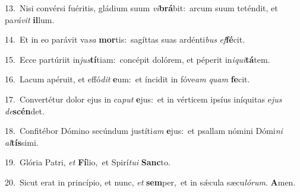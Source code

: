 {\numbfont\textcolor{\numbcolor}{13.}}~Nisi convérsi fuéritis, gládium suum \textit{vi}\-\textbf{brá}bit:~\star arcum suum teténdit, et pa\-\textit{rá}\-\textit{vit} \textbf{il}\-lum.\par
{\numbfont\textcolor{\numbcolor}{14.}}~Et in eo parávit va\textit{sa} \textbf{mor}\-tis:~\star sagíttas suas ardénti\textit{bus} \textit{ef}\-\textbf{fé}cit.\par
{\numbfont\textcolor{\numbcolor}{15.}}~Ecce partúriit in\-\textit{jus}\-\textbf{tí}tiam:~\star concépit dolórem, et péperit in\-\textit{i}\-\textit{qui}\textbf{tá}tem.\par
{\numbfont\textcolor{\numbcolor}{16.}}~Lacum apéruit, et effó\textit{dit} \textbf{e}\-um:~\star et íncidit in fóve\textit{am} \textit{quam} \textbf{fe}\-cit.\par
{\numbfont\textcolor{\numbcolor}{17.}}~Convertétur dolor ejus in ca\textit{put} \textbf{e}\-jus:~\star et in vérticem ipsíus iníquitas e\textit{jus} \textit{de}\-\textbf{scén}det.\par
{\numbfont\textcolor{\numbcolor}{18.}}~Confitébor Dómino secúndum justíti\textit{am} \textbf{e}\-jus:~\star et psallam nómini Dómi\textit{ni} \textit{al}\-\textbf{tís}simi.\par
{\numbfont\textcolor{\numbcolor}{19.}}~Glória Patri, \textit{et} \textbf{Fí}\-lio,~\star et Spirí\-\textit{tu}\-\textit{i} \textbf{Sanc}\-to.\par
{\numbfont\textcolor{\numbcolor}{20.}}~Sicut erat in princípio, et nunc, \textit{et} \textbf{sem}\-per,~\star et in sǽcula sæcu\-\textit{ló}\-\textit{rum}. \textbf{A}\-men.\par
